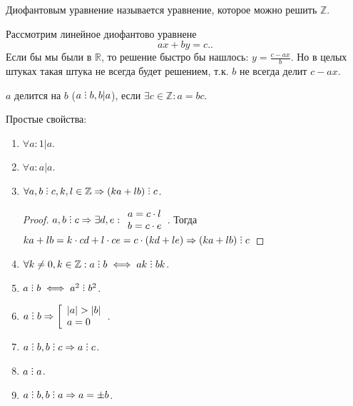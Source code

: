 \begin{definition}
    Диофантовым уравнение называется уравнение, которое можно решить $\mathbb{Z}$.
\end{definition}
Рассмотрим линейное диофантово уравнене \[
 ax+by=c.
.\] 
Если бы мы были в $\mathbb{R}$, то решение быстро бы нашлось: $y = \frac{c - ax}{b}$. Но в целых штуках такая штука не всегда будет решением, т.к. $b$ не всегда делит $c - ax$.
 \begin{definition}
     $a$ делится на $b$ ($a \divby b, b \vert a$), если $\exists c \in \mathbb{Z}: a = bc$.
\end{definition}
Простые свойства:
\begin{enumerate}
    \item             
            $\forall a: 1 \vert a$.
    \item
            $\forall a: a \vert a$.
    \item
        $\forall a, b \divby c, k, l \in \mathbb{Z} \Rightarrow (ka + lb) \divby c$.
            \begin{proof}
                $a, b \divby c \Rightarrow \exists d, e: \begin{array}{l} a = c \cdot l \\ b = c \cdot e \end{array}$. Тогда  $ka + lb = k \cdot cd + l \cdot ce = c \cdot (kd + le) \Rightarrow (ka + lb) \divby c$
            \end{proof}
    \item
            $\forall k \neq 0, k \in \mathbb{Z}: a \divby b \iff ak \divby bk$.
    \item
            $a \divby b \iff a^2 \divby b^2$.
    \item
            $a \divby b \Rightarrow \left[ \begin{array}{l} |a| > |b| \\ a = 0 \end{array} \right.$.
    \item
            $a \divby b, b \divby c \Rightarrow a \divby c$.
    \item 
            $a \divby a$.
    \item 
            $a \divby b, b \divby a \Rightarrow a = \pm b$.
\end{enumerate}

